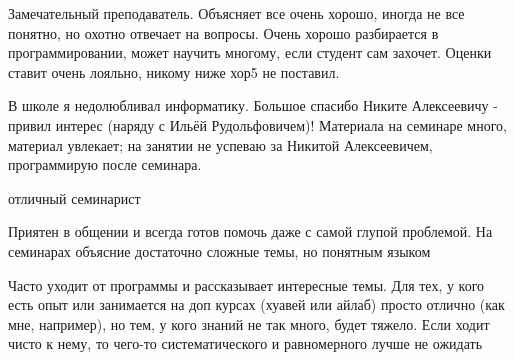             \begin{commentbox} 
                Замечательный преподаватель. Объясняет все очень хорошо, иногда не все понятно, но охотно отвечает на вопросы. Очень хорошо разбирается в программировании, может научить многому, если студент сам захочет. Оценки ставит очень лояльно, никому ниже хор5 не поставил. 
            \end{commentbox} 
        
            \begin{commentbox} 
                В школе я недолюбливал информатику. Большое спасибо Никите Алексеевичу - привил интерес (наряду с Ильёй Рудольфовичем)! Материала на семинаре много, материал увлекает; на занятии не успеваю за Никитой Алексеевичем, программирую после семинара. 
            \end{commentbox} 
        
            \begin{commentbox} 
                отличный семинарист 
            \end{commentbox} 
        
            \begin{commentbox} 
                Приятен в общении и всегда готов помочь даже с самой глупой проблемой. На семинарах объясние достаточно сложные темы, но понятным языком 
            \end{commentbox} 
        
            \begin{commentbox} 
                Часто уходит от программы и рассказывает интересные темы. Для тех, у кого есть опыт или занимается на доп курсах (хуавей или айлаб) просто отлично (как мне, например), но тем, у кого знаний не так много, будет тяжело. Если ходит чисто к нему, то чего-то систематического и равномерного лучше не ожидать 
            \end{commentbox} 

    
